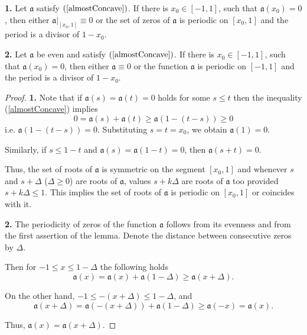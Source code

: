 \begin{lm}
\label{periodicity}
{\bf 1.} Let $\mathfrak a$ satisfy $(\ref{almostConcave})$.
If there is $x_0 \in [-1, 1]$, such that $\mathfrak a(x_0) = 0$,
then either $\mathfrak a \Big|_{[x_0, 1]} \equiv 0$
or the set of zeros of $\mathfrak a$ is periodic on $[x_0, 1]$
and the period is a divisor of $1 - x_0$.

{\bf 2.} Let $\mathfrak a$ be even and satisfy $(\ref{almostConcave})$.
If there is $x_0 \in [-1, 1]$, such that $\mathfrak a(x_0) = 0$,
then either $\mathfrak a \equiv 0$
or the function $\mathfrak a$ is periodic on $[-1, 1]$
and the period is a divisor of $1 - x_0$.
\end{lm}

\begin{proof}
{\bf 1.}
Note that if $\mathfrak a(s) = \mathfrak a(t) = 0$ holds for some $s \le t$
then the inequality (\ref{almostConcave}) implies
$$0 = \mathfrak a(s) + \mathfrak a(t) \ge \mathfrak a( 1 - (t - s) ) \ge 0$$
i.e. $\mathfrak a(1 - (t - s)) = 0$.
Substituting $s = t = x_0$, we obtain $\mathfrak a(1) = 0$.

Similarly, if $s \le 1 - t$ and $\mathfrak a(s) = \mathfrak a(1 - t) = 0$, then $\mathfrak a(s + t) = 0$.

Thus, the set of roots of $\mathfrak a$ is symmetric on the segment $[x_0, 1]$ and
whenever $s$ and $s + \Delta$ ($\Delta \ge 0$) are roots of $\mathfrak a$,
values $s + k\Delta$ are roots of $\mathfrak a$ too provided $s + k\Delta \le 1$.
This implies the set of roots of $\mathfrak a$ is periodic on $[x_0, 1]$
or coincides with it.

{\bf 2.} The periodicity of zeros of the function $\mathfrak a$ follows from its evenness and from the first assertion of the lemma.
Denote the distance between consecutive zeros by $\Delta$.

Then for $-1 \le x \le 1 - \Delta$ the following holds
$$\mathfrak a(x) = \mathfrak a(x) + \mathfrak a(1 - \Delta) \ge \mathfrak a(x + \Delta).$$

On the other hand, $-1 \le -(x + \Delta) \le 1 - \Delta$, and
$$\mathfrak a(x + \Delta) = \mathfrak a(-(x + \Delta)) + \mathfrak a(1 - \Delta) \ge \mathfrak a(-x) = \mathfrak a(x).$$

Thus, $\mathfrak a(x) = \mathfrak a(x + \Delta)$.
\end{proof}

